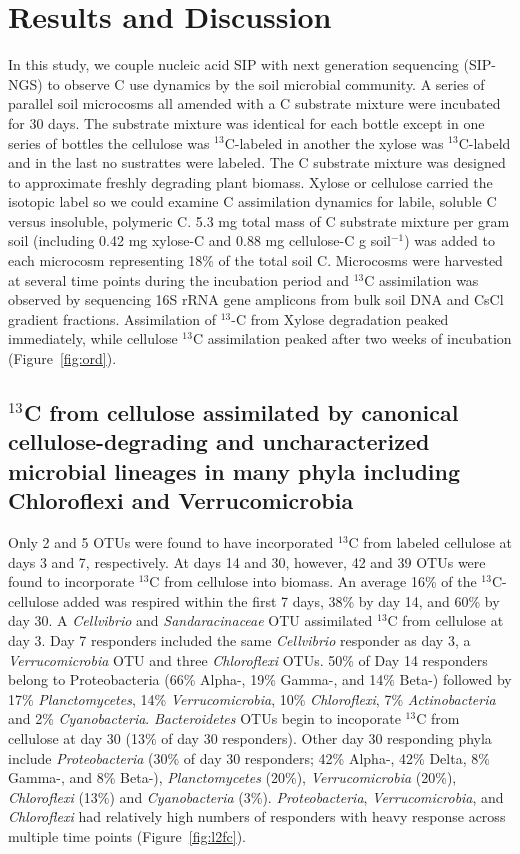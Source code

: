 \section{Results and Discussion}
In this study, we couple nucleic acid SIP with next generation sequencing
(SIP-NGS) to observe C use dynamics by the soil microbial community. A series
of parallel soil microcosms all amended with a C substrate mixture were
incubated for 30 days. The substrate mixture was identical for each bottle
except in one series of bottles the cellulose was $^{13}$C-labeled in another
the xylose was $^{13}$C-labeld and in the last no sustrattes were labeled. The
C substrate mixture was designed to approximate freshly degrading plant
biomass. Xylose or cellulose carried the isotopic label so we could examine C
assimilation dynamics for labile, soluble C versus insoluble, polymeric C. 5.3
mg total mass of C substrate mixture per gram soil (including 0.42 mg xylose-C
and 0.88 mg cellulose-C g soil$^{-1}$) was added to each microcosm representing
18\% of the total soil C. Microcosms were harvested at several time points
during the incubation period and $^{13}$C assimilation was observed by
sequencing 16S rRNA gene amplicons from bulk soil DNA and CsCl gradient
fractions. Assimilation of $^{13}$-C from Xylose degradation peaked immediately, 
while cellulose $^{13}$C assimilation peaked after two weeks of incubation
(Figure~\ref{fig:ord}).

\subsection{$^{13}$C from cellulose assimilated by canonical
cellulose-degrading and uncharacterized microbial lineages in many phyla
including Chloroflexi and Verrucomicrobia} 
Only 2 and 5 OTUs were found to have incorporated $^{13}$C from labeled
cellulose at days 3 and 7, respectively. At days 14 and 30, however, 42 and 39
OTUs were found to incorporate $^{13}$C from cellulose into biomass. An average
16\% of the $^{13}$C-cellulose added was respired within the first 7 days, 38\%
by day 14, and 60\% by day 30. A \textit{Cellvibrio} and
\textit{Sandaracinaceae} OTU assimilated $^{13}$C from cellulose at day 3. Day
7 responders included the same \textit{Cellvibrio} responder as day 3, a
\textit{Verrucomicrobia} OTU and three \textit{Chloroflexi} OTUs. 50\% of Day
14 responders belong to Proteobacteria (66\% Alpha-, 19\% Gamma-, and 14\%
Beta-) followed by 17\% \textit{Planctomycetes}, 14\% \textit{Verrucomicrobia},
10\% \textit{Chloroflexi}, 7\% \textit{Actinobacteria} and 2\%
\textit{Cyanobacteria}. \textit{Bacteroidetes} OTUs begin to incoporate
$^{13}$C from cellulose at day 30 (13\% of day 30 responders). Other day 30
responding phyla include \textit{Proteobacteria} (30\% of day 30 responders;
42\% Alpha-, 42\% Delta, 8\% Gamma-, and 8\% Beta-), \textit{Planctomycetes}
(20\%), \textit{Verrucomicrobia} (20\%), \textit{Chloroflexi} (13\%) and
\textit{Cyanobacteria} (3\%). \textit{Proteobacteria},
\textit{Verrucomicrobia}, and \textit{Chloroflexi} had relatively high numbers
of responders with heavy response across multiple time points
(Figure~\ref{fig:l2fc}).

